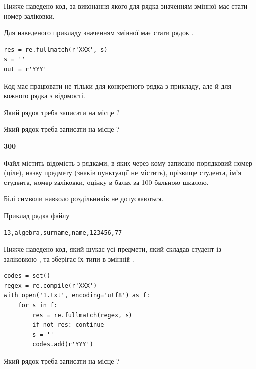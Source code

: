 Нижче наведено код, за виконання якого для рядка  значенням змінної  має стати номер заліковки.

Для наведеного прикладу значенням змінної  має стати рядок  .



\begin{verbatim}
res = re.fullmatch(r'XXX', s)
s = ''
out = r'YYY'
\end{verbatim}


Код має працювати не тільки для конкретного рядка з прикладу, але й для кожного рядка з відомості.




Який рядок треба записати на місце  ?\par
\vspace{5mm}


Який рядок треба записати на місце  ?\par


\newpage

{\begin {center}\textbf{ 300}\end {center}}\par
Файл  містить відомість з рядками, в яких через кому записано поряд\-ковий номер (ціле), назву предмету (знаків пунктуації не містить), прізвище студента, ім'я студента, номер заліковки, оцінку в балах за 100 бальною шкалою.

Білі символи навколо роздільників не допускаються.

Приклад рядка файлу



\begin{verbatim}
13,algebra,surname,name,123456,77
\end{verbatim}


Нижче наведено код, який шукає усі предмети, який складав студент із заліковкою , та зберігає їх типи в змінній .



\begin{verbatim}
codes = set()
regex = re.compile(r'XXX')
with open('1.txt', encoding='utf8') as f:
    for s in f:
        res = re.fullmatch(regex, s)
        if not res: continue
        s = ''
        codes.add(r'YYY')
\end{verbatim}





Який рядок треба записати на місце  ?\par
\vspace{5mm}


